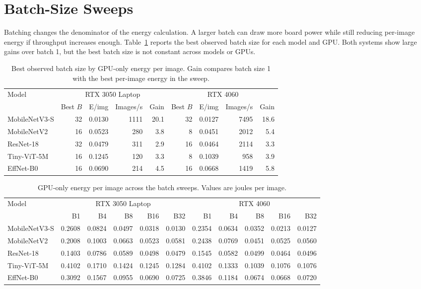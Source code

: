 \documentclass[conference]{IEEEtran}
\begin{document}
\section{Batch-Size Sweeps}

Batching changes the denominator of the energy calculation. A larger batch can
draw more board power while still reducing per-image energy if throughput
increases enough. Table~\ref{tab:bestbatch} reports the best observed batch
size for each model and GPU. Both systems show large gains over batch 1, but
the best batch size is not constant across models or GPUs.

\begin{table}[t]
\centering
\caption{Best observed batch size by GPU-only energy per image. Gain compares
batch size 1 with the best per-image energy in the sweep.}
\label{tab:bestbatch}
\scriptsize
\begin{tabular}{@{}lrrrrrrrr@{}}
\toprule
Model & \multicolumn{4}{c}{RTX 3050 Laptop} &
\multicolumn{4}{c}{RTX 4060}\\
\cmidrule(lr){2-5}\cmidrule(lr){6-9}
 & Best $B$ & E/img & Images/s & Gain &
 Best $B$ & E/img & Images/s & Gain\\
\midrule
MobileNetV3-S & 32 & 0.0130 & 1111 & 20.1 & 32 & 0.0127 & 7495 & 18.6\\
MobileNetV2 & 16 & 0.0523 & 280 & 3.8 & 8 & 0.0451 & 2012 & 5.4\\
ResNet-18 & 32 & 0.0479 & 311 & 2.9 & 16 & 0.0464 & 2114 & 3.3\\
Tiny-ViT-5M & 16 & 0.1245 & 120 & 3.3 & 8 & 0.1039 & 958 & 3.9\\
EffNet-B0 & 16 & 0.0690 & 214 & 4.5 & 16 & 0.0668 & 1419 & 5.8\\
\bottomrule
\end{tabular}
\end{table}

\begin{table}[t]
\centering
\caption{GPU-only energy per image across the batch sweeps. Values are joules
per image.}
\label{tab:batchcurve}
\tiny
\begin{tabular}{@{}lrrrrrrrrrr@{}}
\toprule
Model & \multicolumn{5}{c}{RTX 3050 Laptop} &
\multicolumn{5}{c}{RTX 4060}\\
\cmidrule(lr){2-6}\cmidrule(lr){7-11}
 & B1 & B4 & B8 & B16 & B32 & B1 & B4 & B8 & B16 & B32\\
\midrule
MobileNetV3-S & 0.2608 & 0.0824 & 0.0497 & 0.0318 & 0.0130 & 0.2354 & 0.0634 & 0.0352 & 0.0213 & 0.0127\\
MobileNetV2 & 0.2008 & 0.1003 & 0.0663 & 0.0523 & 0.0581 & 0.2438 & 0.0769 & 0.0451 & 0.0525 & 0.0560\\
ResNet-18 & 0.1403 & 0.0786 & 0.0589 & 0.0498 & 0.0479 & 0.1545 & 0.0582 & 0.0499 & 0.0464 & 0.0496\\
Tiny-ViT-5M & 0.4102 & 0.1710 & 0.1424 & 0.1245 & 0.1284 & 0.4102 & 0.1333 & 0.1039 & 0.1076 & 0.1076\\
EffNet-B0 & 0.3092 & 0.1567 & 0.0955 & 0.0690 & 0.0725 & 0.3846 & 0.1184 & 0.0674 & 0.0668 & 0.0720\\
\bottomrule
\end{tabular}
\end{table}
\end{document}
